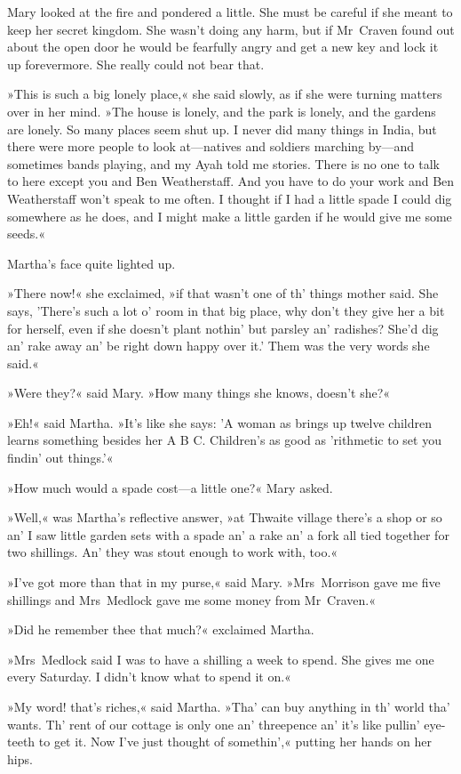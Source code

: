 Mary looked at the fire and pondered a little. She must be careful if she meant to keep her secret kingdom. She wasn't doing any harm, but if Mr~Craven found out about the open door he would be fearfully angry and get a new key and lock it up forevermore. She really could not bear that.

»This is such a big lonely place,« she said slowly, as if she were turning matters over in her mind. »The house is lonely, and the park is lonely, and the gardens are lonely. So many places seem shut up. I never did many things in India, but there were more people to look at—natives and soldiers marching by—and sometimes bands playing, and my Ayah told me stories. There is no one to talk to here except you and Ben Weatherstaff. And you have to do your work and Ben Weatherstaff won't speak to me often. I thought if I had a little spade I could dig somewhere as he does, and I might make a little garden if he would give me some seeds.«

Martha's face quite lighted up.

»There now!« she exclaimed, »if that wasn't one of th' things mother said. She says, 'There's such a lot o' room in that big place, why don't they give her a bit for herself, even if she doesn't plant nothin' but parsley an' radishes? She'd dig an' rake away an' be right down happy over it.' Them was the very words she said.«

»Were they?« said Mary. »How many things she knows, doesn't she?«

»Eh!« said Martha. »It's like she says: 'A woman as brings up twelve children learns something besides her A B C. Children's as good as 'rithmetic to set you findin' out things.'«

»How much would a spade cost—a little one?« Mary asked.

»Well,« was Martha's reflective answer, »at Thwaite village there's a shop or so an' I saw little garden sets with a spade an' a rake an' a fork all tied together for two shillings. An' they was stout enough to work with, too.«

»I've got more than that in my purse,« said Mary. »Mrs~Morrison gave me five shillings and Mrs~Medlock gave me some money from Mr~Craven.«

»Did he remember thee that much?« exclaimed Martha.

»Mrs~Medlock said I was to have a shilling a week to spend. She gives me one every Saturday. I didn't know what to spend it on.«

»My word! that's riches,« said Martha. »Tha' can buy anything in th' world tha' wants. Th' rent of our cottage is only one an' threepence an' it's like pullin' eye-teeth to get it. Now I've just thought of somethin',« putting her hands on her hips.

